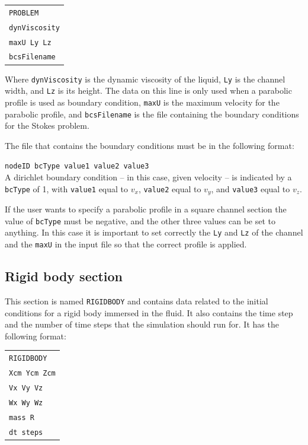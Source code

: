 \documentclass[12pt]{article}
\begin{document}
\begin{tabular}{l}
\texttt{PROBLEM}\\
\texttt{dynViscosity}\\
\texttt{maxU Ly Lz}\\
\texttt{bcsFilename}
\end{tabular}

Where \verb+dynViscosity+ is the dynamic viscosity of the liquid,  \verb+Ly+ is the channel width, and \verb+Lz+ is its height. The data on this line is only used when a parabolic profile is used as boundary condition, \verb+maxU+ is the maximum velocity for the parabolic profile, and \verb+bcsFilename+ is the file containing the boundary conditions for the Stokes problem.

The file that contains the boundary conditions must be in the following format:

\texttt{nodeID bcType value1 value2 value3}\\

A dirichlet boundary condition -- in this case, given velocity -- is indicated by a \verb+bcType+ of 1, with \verb+value1+ equal to $v_x$, \verb+value2+ equal to $v_y$, and \verb+value3+ equal to $v_z$.

If the user wants to specify a parabolic profile in a square channel section the value of \verb+bcType+ must be negative, and the other three values can be set to anything. In this case it is important to set correctly the \verb+Ly+ and \verb+Lz+ of the channel and the \verb+maxU+ in the input file so that the correct profile is applied.

\subsection{Rigid body section}
This section is named \verb+RIGIDBODY+ and contains data related to the initial conditions for a rigid body immersed in the fluid. It also contains the time step and the number of time steps that the simulation should run for. It has the following format:

\begin{tabular}{l}
\texttt{RIGIDBODY}\\
\texttt{Xcm Ycm Zcm}\\
\texttt{Vx     Vy    Vz}\\
\texttt{Wx    Wy   Wz}\\
\texttt{mass R}\\
\texttt{dt steps}
\end{tabular}
\end{document}
